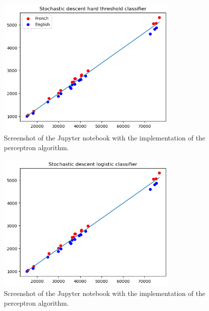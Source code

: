 \documentclass[a4paper]{article}
\begin{document}
\begin{figure}
    \centering
    \includegraphics[width=0.8\textwidth]{figures/Stochastic descent hard threshold classifier.png}
    \caption{Screenshot of the Jupyter notebook with the implementation of the perceptron algorithm.}
    \label{fig:Stochastic_descent_hard_threshold_classifier}
\end{figure}

\begin{figure}
    \centering
    \includegraphics[width=0.8\textwidth]{figures/Stoschastic descent logistic classifier.png}
    \caption{Screenshot of the Jupyter notebook with the implementation of the perceptron algorithm.}
    \label{fig:classifier_result_1}
\end{figure}
\end{document}
